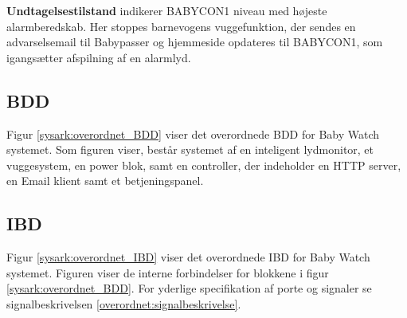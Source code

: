 \textbf{Undtagelsestilstand} indikerer BABYCON1 niveau med højeste alarmberedskab. Her stoppes barnevogens vuggefunktion, der sendes en advarselsemail til Babypasser og hjemmeside opdateres til BABYCON1, som igangsætter afspilning af en alarmlyd. 


\subsection{BDD}
Figur \ref{sysark:overordnet_BDD} viser det overordnede BDD for Baby Watch systemet. Som figuren viser, består systemet af en inteligent lydmonitor, et vuggesystem, en power blok, samt en controller, der indeholder en HTTP server, en Email klient samt et betjeningspanel.


\subsection{IBD}

Figur \ref{sysark:overordnet_IBD} viser det overordnede IBD for Baby Watch systemet.  Figuren viser de interne forbindelser for blokkene i figur \ref{sysark:overordnet_BDD}. For yderlige specifikation af porte og signaler se signalbeskrivelsen \ref{overordnet:signalbeskrivelse}.

